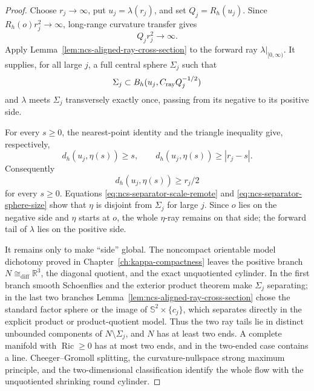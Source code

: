 \documentclass[10pt]{coll-l}
\newcommand{\Sph}{\mathbb{S}}
\newcommand{\diffeo}{\mathrel{\cong_{\mathrm{diff}}}}
\theoremstyle{definition}
\theoremstyle{remark}
\numberwithin{section}{chapter}
\numberwithin{equation}{chapter}
\newcommand{\Ric}{\operatorname{Ric}}
\begin{document}
\begin{proof}
Choose $r_j\to\infty$, put $u_j=\lambda(r_j)$, and set
$Q_j=R_h(u_j)$.  Since $R_h(o)r_j^2\to\infty$, long-range curvature
transfer gives
\begin{equation}
                              Q_jr_j^2\longrightarrow\infty.  \label{eq:ncs-separator-scale-remote}
\end{equation}
Apply Lemma~\ref{lem:ncs-aligned-ray-cross-section} to the forward ray
$\lambda|_{[0,\infty)}$.  It supplies, for all large $j$, a full central
sphere $\Sigma_j$ such that
\begin{equation}
 \Sigma_j\subset B_h(u_j,C_{\rm ray}Q_j^{-1/2})        \label{eq:ncs-separator-sphere-size}
\end{equation}
and $\lambda$ meets $\Sigma_j$ transversely exactly once, passing from its
negative to its positive side.

For every $s\geq0$, the nearest-point identity and the triangle inequality
give, respectively,
\begin{equation}
 d_h(u_j,\eta(s))\geq s,
 \qquad d_h(u_j,\eta(s))\geq |r_j-s|.                 \label{eq:ncs-separator-two-distance-bounds}
\end{equation}
Consequently
\begin{equation}
                       d_h(u_j,\eta(s))\geq r_j/2      \label{eq:ncs-separator-ray-avoidance}
\end{equation}
for every $s\geq0$.  Equations
\eqref{eq:ncs-separator-scale-remote} and
\eqref{eq:ncs-separator-sphere-size} show that $\eta$ is disjoint from
$\Sigma_j$ for large $j$.  Since $o$ lies on the negative side and $\eta$
starts at $o$, the whole $\eta$-ray remains on that side; the forward tail
of $\lambda$ lies on the positive side.

It remains only to make ``side'' global.  The noncompact orientable model
dichotomy proved in Chapter~\ref{ch:kappa-compactness} leaves the positive
branch $N\diffeo\mathbb R^3$, the diagonal quotient, and the exact
unquotiented cylinder.  In the first branch smooth Schoenflies and the
exterior product theorem make $\Sigma_j$ separating; in the last two
branches Lemma~\ref{lem:ncs-aligned-ray-cross-section} chose the standard
factor sphere or the image of
$\Sph^2\times\{c_j\}$, which separates directly in the explicit product
or product-quotient model.
Thus the two ray tails lie in distinct unbounded components of
$N\setminus\Sigma_j$, and $N$ has at least two ends.  A complete manifold
with $\Ric\geq0$ has
at most two ends, and in the two-ended case contains a line.
Cheeger--Gromoll splitting, the curvature-nullspace strong maximum
principle, and the two-dimensional classification identify the whole flow
with the unquotiented shrinking round cylinder.
\end{proof}
\end{document}
